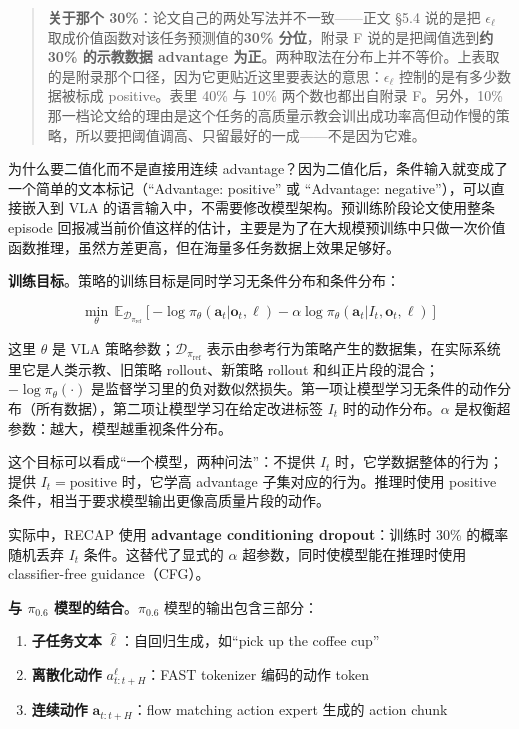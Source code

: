 \documentclass[
  chinese,
]{ctexart}
\providecommand{\tightlist}{%
  \setlength{\itemsep}{0pt}\setlength{\parskip}{0pt}}
\begin{document}
\begin{quote}
\textbf{关于那个 30\%}：论文自己的两处写法并不一致------正文 §5.4
说的是把 \(\epsilon_\ell\) 取成价值函数对该任务预测值的\textbf{30\%
分位}，附录 F 说的是把阈值选到\textbf{约 30\% 的示教数据 advantage
为正}。两种取法在分布上并不等价。上表取的是附录那个口径，因为它更贴近这里要表达的意思：\(\epsilon_\ell\)
控制的是有多少数据被标成 positive。表里 40\% 与 10\% 两个数也都出自附录
F。另外，10\%
那一档论文给的理由是这个任务的高质量示教会训出成功率高但动作慢的策略，所以要把阈值调高、只留最好的一成------不是因为它难。
\end{quote}

为什么要二值化而不是直接用连续
advantage？因为二值化后，条件输入就变成了一个简单的文本标记（``Advantage:
positive'' 或 ``Advantage: negative''），可以直接嵌入到 VLA
的语言输入中，不需要修改模型架构。预训练阶段论文使用整条 episode
回报减当前价值这样的估计，主要是为了在大规模预训练中只做一次价值函数推理，虽然方差更高，但在海量多任务数据上效果足够好。

\textbf{训练目标}。策略的训练目标是同时学习无条件分布和条件分布：

\[
\min_\theta \, \mathbb{E}_{\mathcal{D}_{\pi_\text{ref}}}\left[-\log \pi_\theta(\mathbf{a}_t | \mathbf{o}_t, \ell) - \alpha \log \pi_\theta(\mathbf{a}_t | I_t, \mathbf{o}_t, \ell)\right]
\]

这里 \(\theta\) 是 VLA 策略参数；\(\mathcal{D}_{\pi_\text{ref}}\)
表示由参考行为策略产生的数据集，在实际系统里它是人类示教、旧策略
rollout、新策略 rollout 和纠正片段的混合；\(-\log \pi_\theta(\cdot)\)
是监督学习里的负对数似然损失。第一项让模型学习无条件的动作分布（所有数据），第二项让模型学习在给定改进标签
\(I_t\) 时的动作分布。\(\alpha\)
是权衡超参数：越大，模型越重视条件分布。

这个目标可以看成``一个模型，两种问法''：不提供 \(I_t\)
时，它学数据整体的行为；提供 \(I_t=\text{positive}\) 时，它学高
advantage 子集对应的行为。推理时使用 positive
条件，相当于要求模型输出更像高质量片段的动作。

实际中，RECAP 使用 \textbf{advantage conditioning dropout}：训练时 30\%
的概率随机丢弃 \(I_t\) 条件。这替代了显式的 \(\alpha\)
超参数，同时使模型能在推理时使用 classifier-free guidance（CFG）。

\textbf{与 \(\pi_{0.6}\) 模型的结合}。\(\pi_{0.6}\)
模型的输出包含三部分：

\begin{enumerate}
\def\labelenumi{\arabic{enumi}.}
\tightlist
\item
  \textbf{子任务文本} \(\hat{\ell}\)：自回归生成，如``pick up the coffee
  cup''
\item
  \textbf{离散化动作} \(a^\ell_{t:t+H}\)：FAST tokenizer 编码的动作
  token
\item
  \textbf{连续动作} \(\mathbf{a}_{t:t+H}\)：flow matching action expert
  生成的 action chunk
\end{enumerate}
\end{document}

